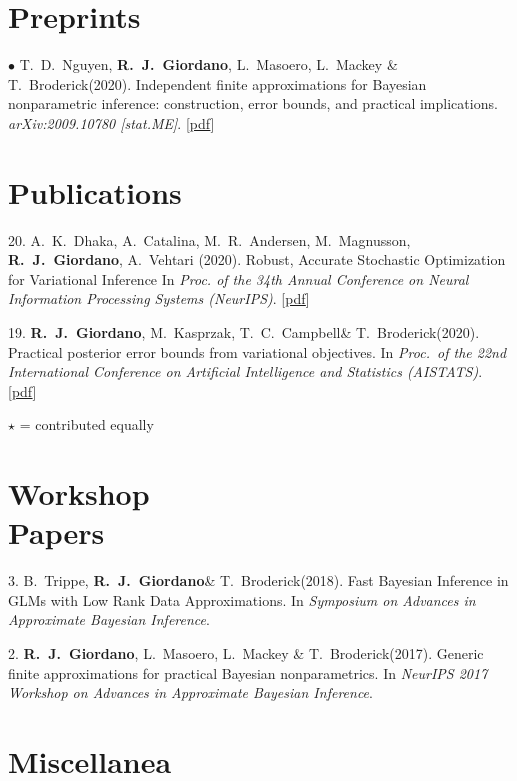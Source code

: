 \documentclass[margin,line]{res}
\newcommand{\me}{\textbf{R.~J.~Giordano}\xspace}
\newcommand{\trevor}{T.~C.~Campbell\xspace}
\newcommand{\tamara}{T.~Broderick\xspace}
\newcommand{\paperref}[1]{[\href{#1}{pdf}]}
\newcommand{\paperref}[1]{}
\begin{document}
\begin{resume}
\section{\sc Preprints}

$\bullet$ T.~D.~Nguyen, \me, L.~Masoero, L.~Mackey \& \tamara (2020).
Independent finite approximations for Bayesian nonparametric inference: construction, error bounds, and practical implications.
\emph{arXiv:2009.10780 [stat.ME]}.
\paperref{https://arxiv.org/abs/2009.10780}



\section{\sc Publications}

20. A.~K.~Dhaka, A.~Catalina, M.~R.~Andersen, M.~Magnusson, \me, A.~Vehtari (2020).
Robust, Accurate Stochastic Optimization for Variational Inference
In \emph{Proc. of the 34th Annual Conference on Neural Information Processing Systems (NeurIPS)}.
\paperref{https://arxiv.org/abs/2009.00666}

19. \me, M.~Kasprzak, \trevor \& \tamara (2020).
Practical posterior error bounds from variational objectives.
In \emph{Proc.~of the 22nd International Conference on Artificial Intelligence and Statistics (AISTATS)}.
\paperref{https://arxiv.org/abs/1910.04102}

$\star$ = contributed equally

\section{\sc Workshop \\ Papers}

3. B.~Trippe, \me \& \tamara (2018).
Fast Bayesian Inference in GLMs with Low Rank Data Approximations.
In \emph{Symposium on Advances in Approximate Bayesian Inference}.

2. \me, L.~Masoero, L.~Mackey \& \tamara (2017).
Generic finite approximations for practical Bayesian nonparametrics.
In \emph{NeurIPS 2017 Workshop on Advances in Approximate Bayesian Inference}.


\section{\sc Miscellanea}


\end{resume}
\end{document}
